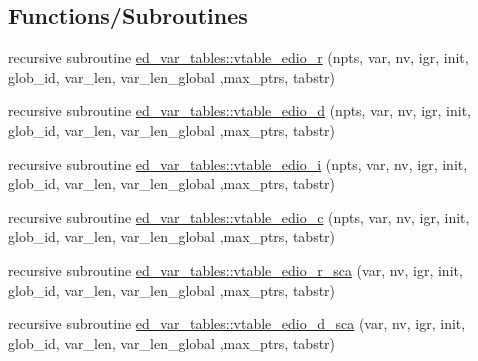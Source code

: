 \subsection*{Functions/\+Subroutines}
\begin{DoxyCompactItemize}
\item 
recursive subroutine \hyperlink{namespaceed__var__tables_a36d6819fcfd324eb837656868073559d}{ed\+\_\+var\+\_\+tables\+::vtable\+\_\+edio\+\_\+r} (npts, var, nv, igr, init, glob\+\_\+id, var\+\_\+len, var\+\_\+len\+\_\+global                                                                                                                                                   ,max\+\_\+ptrs, tabstr)
\item 
recursive subroutine \hyperlink{namespaceed__var__tables_a2d5460567ac0681fd8910275ab986334}{ed\+\_\+var\+\_\+tables\+::vtable\+\_\+edio\+\_\+d} (npts, var, nv, igr, init, glob\+\_\+id, var\+\_\+len, var\+\_\+len\+\_\+global                                                                                                                                                   ,max\+\_\+ptrs, tabstr)
\item 
recursive subroutine \hyperlink{namespaceed__var__tables_aee69080af76c9fa42c7ed981b68e5ce5}{ed\+\_\+var\+\_\+tables\+::vtable\+\_\+edio\+\_\+i} (npts, var, nv, igr, init, glob\+\_\+id, var\+\_\+len, var\+\_\+len\+\_\+global                                                                                                                                                   ,max\+\_\+ptrs, tabstr)
\item 
recursive subroutine \hyperlink{namespaceed__var__tables_aaac5e1ef08aa7ccf93e7916d12ce9c37}{ed\+\_\+var\+\_\+tables\+::vtable\+\_\+edio\+\_\+c} (npts, var, nv, igr, init, glob\+\_\+id, var\+\_\+len, var\+\_\+len\+\_\+global                                                                                                                                                   ,max\+\_\+ptrs, tabstr)
\item 
recursive subroutine \hyperlink{namespaceed__var__tables_a204fa52552675c94e71b2a23cb5d2d63}{ed\+\_\+var\+\_\+tables\+::vtable\+\_\+edio\+\_\+r\+\_\+sca} (var, nv, igr, init, glob\+\_\+id, var\+\_\+len, var\+\_\+len\+\_\+global                                                                                                                                                                       ,max\+\_\+ptrs, tabstr)
\item 
recursive subroutine \hyperlink{namespaceed__var__tables_a6d6f4602657a7fd22ab760b6be0ab061}{ed\+\_\+var\+\_\+tables\+::vtable\+\_\+edio\+\_\+d\+\_\+sca} (var, nv, igr, init, glob\+\_\+id, var\+\_\+len, var\+\_\+len\+\_\+global                                                                                                                                                                       ,max\+\_\+ptrs, tabstr)

\end{DoxyCompactItemize}
